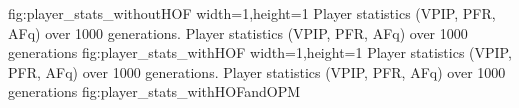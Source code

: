   {fig:player_stats_withoutHOF}%
  {width=1\textwidth,height=1\textheight}%
  {Player statistics (VPIP, PFR, AFq) over 1000 generations.}%
  {Player statistics (VPIP, PFR, AFq) over 1000 generations}%
  {fig:player_stats_withHOF}%
  {width=1\textwidth,height=1\textheight}%
  {Player statistics (VPIP, PFR, AFq) over 1000 generations.}%
  {Player statistics (VPIP, PFR, AFq) over 1000 generations}%
  {fig:player_stats_withHOFandOPM}%


